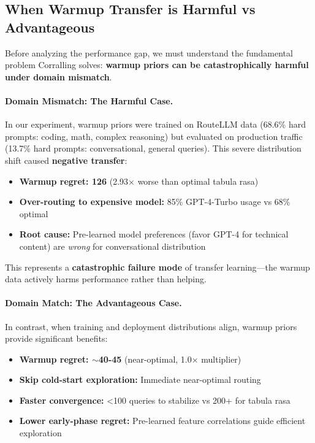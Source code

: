 \subsection{When Warmup Transfer is Harmful vs Advantageous}

Before analyzing the performance gap, we must understand the fundamental problem Corralling solves: \textbf{warmup priors can be catastrophically harmful under domain mismatch}.

\paragraph{Domain Mismatch: The Harmful Case.}
In our experiment, warmup priors were trained on RouteLLM data (68.6\% hard prompts: coding, math, complex reasoning) but evaluated on production traffic (13.7\% hard prompts: conversational, general queries). This severe distribution shift caused \textbf{negative transfer}:

\begin{itemize}[leftmargin=*,nosep]
    \item \textbf{Warmup regret: 126} (2.93× worse than optimal tabula rasa)
    \item \textbf{Over-routing to expensive model:} 85\% GPT-4-Turbo usage vs 68\% optimal
    \item \textbf{Root cause:} Pre-learned model preferences (favor GPT-4 for technical content) are \emph{wrong} for conversational distribution
\end{itemize}

This represents a \textbf{catastrophic failure mode} of transfer learning—the warmup data actively harms performance rather than helping.

\paragraph{Domain Match: The Advantageous Case.}
In contrast, when training and deployment distributions align, warmup priors provide significant benefits:

\begin{itemize}[leftmargin=*,nosep]
    \item \textbf{Warmup regret: $\sim$40-45} (near-optimal, 1.0× multiplier)
    \item \textbf{Skip cold-start exploration:} Immediate near-optimal routing
    \item \textbf{Faster convergence:} <100 queries to stabilize vs 200+ for tabula rasa
    \item \textbf{Lower early-phase regret:} Pre-learned feature correlations guide efficient exploration
\end{itemize}

